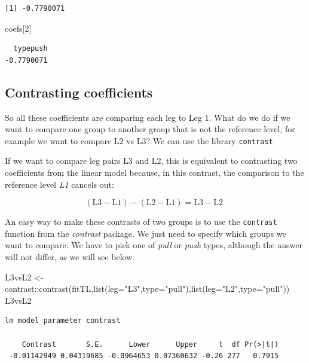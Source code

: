 \documentclass[
  letterpaper,
  DIV=11,
  numbers=noendperiod]{scrartcl}
\newenvironment{Shaded}{\begin{snugshade}}{\end{snugshade}}
\newcommand{\AttributeTok}[1]{\textcolor[rgb]{0.40,0.45,0.13}{#1}}
\newcommand{\DecValTok}[1]{\textcolor[rgb]{0.68,0.00,0.00}{#1}}
\newcommand{\FunctionTok}[1]{\textcolor[rgb]{0.28,0.35,0.67}{#1}}
\newcommand{\NormalTok}[1]{\textcolor[rgb]{0.00,0.23,0.31}{#1}}
\newcommand{\OtherTok}[1]{\textcolor[rgb]{0.00,0.23,0.31}{#1}}
\newcommand{\SpecialCharTok}[1]{\textcolor[rgb]{0.37,0.37,0.37}{#1}}
\newcommand{\StringTok}[1]{\textcolor[rgb]{0.13,0.47,0.30}{#1}}
\begin{document}
\begin{verbatim}
[1] -0.7790071
\end{verbatim}

\begin{Shaded}
\begin{Highlighting}[]
\NormalTok{coefs[}\DecValTok{2}\NormalTok{]}
\end{Highlighting}
\end{Shaded}

\begin{verbatim}
  typepush 
-0.7790071 
\end{verbatim}

\subsection{Contrasting coefficients}\label{contrasting-coefficients}

So all these coefficients are comparing each leg to Leg 1. What do we do
if we want to compare one group to another group that is not the
reference level, for example we want to compare L2 vs L3? We can use the
library \texttt{contrast}

If we want to compare leg pairs L3 and L2, this is equivalent to
contrasting two coefficients from the linear model because, in this
contrast, the comparison to the reference level \emph{L1} cancels out:

\[ (\mbox{L3} - \mbox{L1}) - (\mbox{L2} - \mbox{L1}) = \mbox{L3} - \mbox{L2 }\]

An easy way to make these contrasts of two groups is to use the
\texttt{contrast} function from the \emph{contrast} package. We just
need to specify which groups we want to compare. We have to pick one of
\emph{pull} or \emph{push} types, although the answer will not differ,
as we will see below.

\begin{Shaded}
\begin{Highlighting}[]
\NormalTok{L3vsL2 }\OtherTok{\textless{}{-}}\NormalTok{ contrast}\SpecialCharTok{::}\FunctionTok{contrast}\NormalTok{(fitTL,}\FunctionTok{list}\NormalTok{(}\AttributeTok{leg=}\StringTok{"L3"}\NormalTok{,}\AttributeTok{type=}\StringTok{"pull"}\NormalTok{),}\FunctionTok{list}\NormalTok{(}\AttributeTok{leg=}\StringTok{"L2"}\NormalTok{,}\AttributeTok{type=}\StringTok{"pull"}\NormalTok{))}
\NormalTok{L3vsL2}
\end{Highlighting}
\end{Shaded}

\begin{verbatim}
lm model parameter contrast

    Contrast       S.E.      Lower      Upper     t  df Pr(>|t|)
 -0.01142949 0.04319685 -0.0964653 0.07360632 -0.26 277   0.7915
\end{verbatim}
\end{document}
